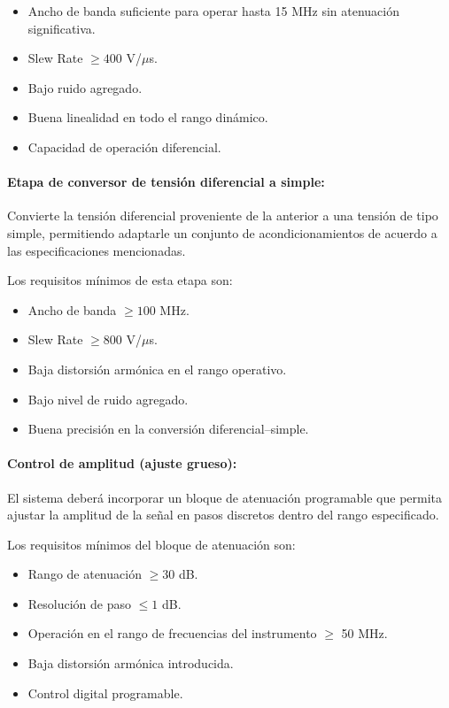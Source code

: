\begin{itemize}[label=\textbullet]
	\item Ancho de banda suficiente para operar hasta 15 MHz sin atenuación significativa.
	\item Slew Rate $\geq 400$ V/$\mu$s.
	\item Bajo ruido agregado.
	\item Buena linealidad en todo el rango dinámico.
	\item Capacidad de operación diferencial.
\end{itemize}

\paragraph{Etapa de conversor de tensión diferencial a simple:} Convierte la tensión diferencial proveniente de la anterior a una tensión de tipo simple, permitiendo adaptarle un conjunto de acondicionamientos de acuerdo a las especificaciones mencionadas.

Los requisitos mínimos de esta etapa son:

\begin{itemize}[label=\textbullet]
	\item Ancho de banda $\geq 100$ MHz.
	\item Slew Rate $\geq 800$ V/$\mu$s.
	\item Baja distorsión armónica en el rango operativo.
	\item Bajo nivel de ruido agregado.
	\item Buena precisión en la conversión diferencial–simple.
\end{itemize}

\paragraph{Control de amplitud (ajuste grueso):}
El sistema deberá incorporar un bloque de atenuación programable que permita ajustar la amplitud de la señal en pasos discretos dentro del rango especificado.

Los requisitos mínimos del bloque de atenuación son:

\begin{itemize}[label=\textbullet]
	\item Rango de atenuación $\geq 30$ dB.
	\item Resolución de paso $\leq 1$ dB.
	\item Operación en el rango de frecuencias del instrumento $\geq$ 50 MHz.
	\item Baja distorsión armónica introducida.
	\item Control digital programable.
\end{itemize}

